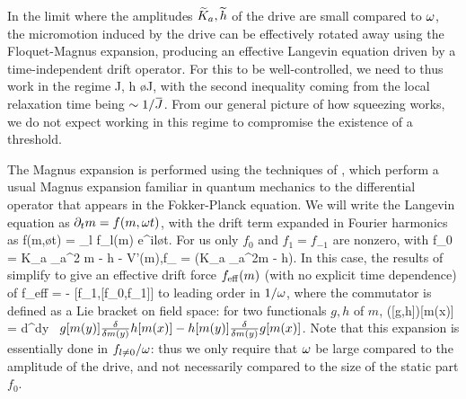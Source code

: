 \documentclass[pra,aps,twocolumn,groupedaddress,superscriptaddress,nofootinbib,preprintnumbers]{revtex4-2}
\begin{document}
\begin{widetext}
		In the limit where the amplitudes $\widetilde K_a, \widetilde h$ of the drive are small compared to $\omega$, the micromotion induced by the drive can be effectively rotated away using the Floquet-Magnus expansion, producing an effective Langevin equation driven by a time-independent drift operator. For this to be well-controlled, we need to thus work in the regime 
		\be \wt J, \wt h \ll \o \ll \ob J,\ee 
		with the second inequality coming from the local relaxation time being $\sim 1/\ob J$. From our general picture of how squeezing works, we do not expect working in this regime to compromise the existence of a threshold. 
		
		The Magnus expansion is performed using the techniques of \cite{higashikawa2018floquet}, which perform a usual Magnus expansion familiar in quantum mechanics to the differential operator that appears in the Fokker-Planck equation. We will write the Langevin equation as $\partial_t m = f(m,\omega t)$, with the drift term expanded in Fourier harmonics as 
		\be f(m,\o t) = \sum_l f_l(m) e^{il\o t}.\ee  
		For us only $f_0$ and $f_1 = f_{-1}$ are nonzero, with 
		\be f_0 = \ob K_a \p_a^2 m - \ob h - V'(m),\qq f_{} =  (\wt K_a \p_a^2m - \wt h).\ee
		In this case, the results of \cite{higashikawa2018floquet} simplify to give an effective drift force $f_{\rm eff}(m)$ (with no explicit time dependence) of 
		\be f_{\rm eff} = -  [f_1,[f_0,f_1]]\ee 
		to leading order in $1/\omega$, where the commutator is defined as a Lie bracket on field space: for two functionals $g,h$ of $m$, 
		\be ([g,h])[m(x)] = \int d^dy \, \( g[m(y)] \frac{\d }{\d m(y)} h[m(x)] - h[m(y)] \frac{\d }{\d m(y)} g[m(x)] \). \ee
		Note that this expansion is essentially done in $f_{l\neq 0} / \omega$: thus we only require that $\omega$ be large compared to the amplitude of the drive, and not necessarily compared to the size of the static part $f_0$. 
		

\end{widetext}
\end{document}
